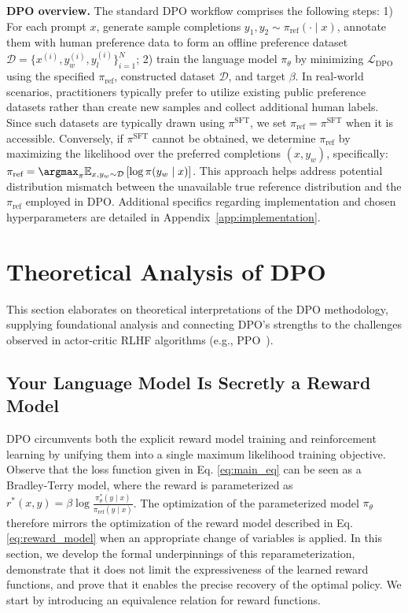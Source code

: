 \textbf{DPO overview.} The standard DPO workflow comprises the following steps: 1) For each prompt $x$, generate sample completions $y_1, y_2 \sim \pi_\text{ref}(\cdot \mid x)$, annotate them with human preference data to form an offline preference dataset $\mathcal{D} = \{x^{(i)}, y_w^{(i)}, y_l^{(i)}\}_{i=1}^N$; 2) train the language model $\pi_\theta$ by minimizing $\mathcal{L}_\text{DPO}$ using the specified $\pi_\text{ref}$, constructed dataset $\mathcal{D}$, and target $\beta$. 
In real-world scenarios, practitioners typically prefer to utilize existing public preference datasets rather than create new samples and collect additional human labels. Since such datasets are typically drawn using $\pi^\text{SFT}$, we set $\pi_\text{ref} = \pi^\text{SFT}$ when it is accessible. Conversely, if $\pi^\text{SFT}$ cannot be obtained, we determine $\pi_\text{ref}$ by maximizing the likelihood over the preferred completions ${(x, y_w)}$, specifically: ${\pi_\text{ref} = \argmax_{\pi}\mathbb{E}_{x, y_w \sim \mathcal{D}}\left[\log \pi(y_w \mid x)\right]}$. This approach helps address potential distribution mismatch between the unavailable true reference distribution and the $\pi_\text{ref}$ employed in DPO. Additional specifics regarding implementation and chosen hyperparameters are detailed in Appendix~\ref{app:implementation}.

\section{Theoretical Analysis of DPO} This section elaborates on theoretical interpretations of the DPO methodology, supplying foundational analysis and connecting DPO’s strengths to the challenges observed in actor-critic RLHF algorithms (e.g., PPO~\cite{schulman2017proximal}).

\label{sec:theory}

\subsection{Your Language Model Is Secretly a Reward Model} DPO circumvents both the explicit reward model training and reinforcement learning by unifying them into a single maximum likelihood training objective. Observe that the loss function given in Eq. \ref{eq:main_eq} can be seen as a Bradley-Terry model, where the reward is parameterized as $r^*(x, y) = \beta \log\frac{\pi^*_\theta(y \mid x)}{\pi_\text{ref}(y \mid x)}$. The optimization of the parameterized model $\pi_{\theta}$ therefore mirrors the optimization of the reward model described in Eq. \ref{eq:reward_model} when an appropriate change of variables is applied. In this section, we develop the formal underpinnings of this reparameterization, demonstrate that it does not limit the expressiveness of the learned reward functions, and prove that it enables the precise recovery of the optimal policy. We start by introducing an equivalence relation for reward functions.

